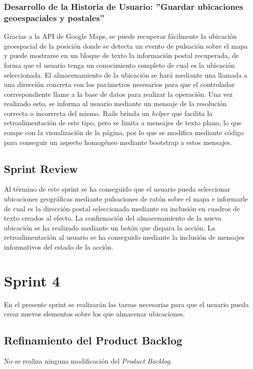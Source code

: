 	\subsubsection{Desarrollo de la Historia de Usuario: ''Guardar ubicaciones geoespaciales y postales''}
	
	Gracias a la API de Google Maps, se puede recuperar fácilmente la ubicación geoespacial de la posición donde se detecta un evento de pulsación sobre el mapa y puede mostrarse en un bloque de texto la información postal recuperada, de forma que el usuario tenga un conocimiento completo de cual es la ubicación seleccionada.
	El almacenamiento de la ubicación se hará mediante una llamada a una dirección concreta con los parámetros necesarios para que el controlador correspondiente llame a la base de datos para realizar la operación. Una vez realizado esto, se informa al usuario mediante un mensaje de la resolución correcta o incorrecta del mismo. Rails brinda un \textit{helper} que facilita la retroalimentación de este tipo, pero se limita a mensajes de texto plano, lo que rompe con la visualización de la página, por lo que se modifica mediante código para conseguir un aspecto homogéneo mediante bootstrap a estos mensajes.
		
	\subsection{Sprint Review}
	Al término de este sprint se ha conseguido que el usuario pueda seleccionar ubicaciones geográficas mediante pulsaciones de ratón sobre el mapa e informarle de cual es la dirección postal seleccionada mediante su inclusión en cuadros de texto creados al efecto. La confirmación del almacenamiento de la nueva ubicación se ha realizado mediante un botón que dispara la acción. La retroalimentación al usuario se ha conseguido mediante la inclusión de mensajes informativos del estado de la acción. 

\section{Sprint 4}
	En el presente sprint se realizarán las tareas necesarias para que el usuario pueda crear nuevos elementos sobre los que almacenar ubicaciones.
	
	\subsection{Refinamiento del Product Backlog}
	No se realiza ninguna modificación del \textit{Product Backlog}.
	
